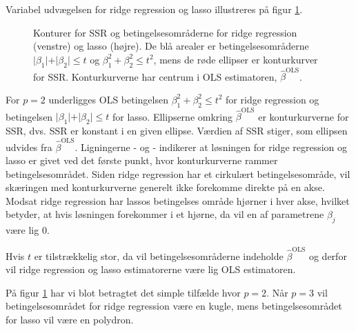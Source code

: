 Variabel udvægelsen for ridge regression og lasso illustreres på figur \ref{fig:LassoRig}.
\begin{figure}[H]
\begin{minipage}{0.5\linewidth}
\scalebox{0.8}{}
\end{minipage}
\hspace{0.3cm}
\begin{minipage}{0.5\linewidth}
\scalebox{0.8}{}
\end{minipage}
\caption{Konturer for SSR og betingelsesområderne for ridge regression (venstre) og lasso (højre). De blå arealer er betingelsesområderne $\vert \beta_1 \vert+\vert \beta_2 \vert \leq t$ og $\beta_1^2+\beta_2^2 \leq t^2$, mens de røde ellipser er konturkurver for SSR. Konturkurverne har centrum i OLS estimatoren, $\hat{\beta}^\text{OLS}$.} \label{fig:LassoRig}
\end{figure}
For $p=2$ underligges OLS betingelsen $\beta_1^2 + \beta_2^2 \leq t^2$ for ridge regression og betingelsen $\vert \beta_1 \vert + \vert \beta_2 \vert \leq t$ for lasso.
Ellipserne omkring $\hat{\beta}^{\text{OLS}}$ er konturkurverne for SSR, dvs. SSR er konstant i en given ellipse. Værdien af SSR stiger, som ellipsen udvides fra $\hat{\beta}^{\text{OLS}}$.
Ligningerne - og - indikerer at løsningen for ridge regression og lasso er givet ved det første punkt, hvor konturkurverne rammer betingelsesområdet.
Siden ridge regression har et cirkulært betingelsesområde, vil skæringen med konturkurverne generelt ikke forekomme direkte på en akse.
Modsat ridge regression har lassos betingelses område hjørner i hver akse, hvilket betyder, at hvis løsningen forekommer i et hjørne, da vil en af parametrene $\beta_j$ være lig 0.

Hvis $t$ er tilstrækkelig stor, da vil betingelsesområderne indeholde $\hat{\beta}^{\text{OLS}}$ og derfor vil ridge regression og lasso estimatorerne være lig OLS estimatoren.

På figur \ref{fig:LassoRig} har vi blot betragtet det simple tilfælde hvor $p=2$. Når $p=3$ vil betingelsesområdet for ridge regression være en kugle, mens betingelsesområdet for lasso vil være en polydron. 

